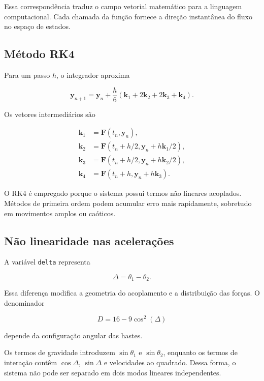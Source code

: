 \documentclass[12pt,a4paper]{article}
\begin{document}
Essa correspondência traduz o campo vetorial matemático para a linguagem computacional. Cada chamada da função fornece a direção instantânea do fluxo no espaço de estados.

\subsection{Método RK4}

Para um passo $h$, o integrador aproxima

\begin{equation}
\mathbf y_{n+1}
=
\mathbf y_n+
\frac{h}{6}(\mathbf k_1+2\mathbf k_2+2\mathbf k_3+\mathbf k_4).
\end{equation}

Os vetores intermediários são

\begin{align}
\mathbf k_1&=\mathbf F(t_n,\mathbf y_n),\\
\mathbf k_2&=\mathbf F(t_n+h/2,\mathbf y_n+h\mathbf k_1/2),\\
\mathbf k_3&=\mathbf F(t_n+h/2,\mathbf y_n+h\mathbf k_2/2),\\
\mathbf k_4&=\mathbf F(t_n+h,\mathbf y_n+h\mathbf k_3).
\end{align}

O RK4 é empregado porque o sistema possui termos não lineares acoplados. Métodos de primeira ordem podem acumular erro mais rapidamente, sobretudo em movimentos amplos ou caóticos.

\subsection{Não linearidade nas acelerações}

A variável \texttt{delta} representa

\begin{equation}
\Delta=\theta_1-\theta_2.
\end{equation}

Essa diferença modifica a geometria do acoplamento e a distribuição das forças. O denominador

\begin{equation}
D=16-9\cos^2(\Delta)
\end{equation}

depende da configuração angular das hastes.

Os termos de gravidade introduzem $\sin\theta_1$ e $\sin\theta_2$, enquanto os termos de interação contêm $\cos\Delta$, $\sin\Delta$ e velocidades ao quadrado. Dessa forma, o sistema não pode ser separado em dois modos lineares independentes.
\end{document}

